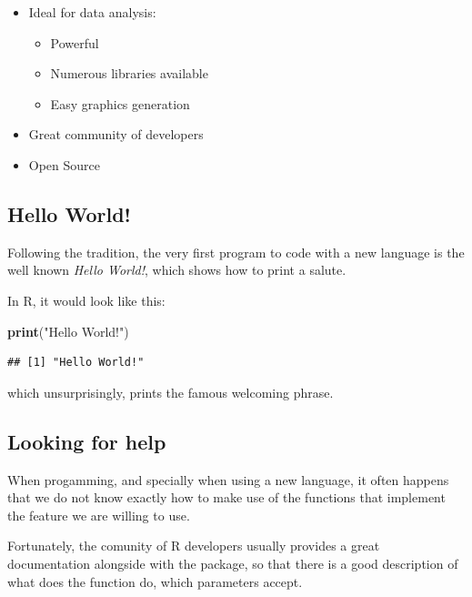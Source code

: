 \documentclass[]{article}
\newenvironment{Shaded}{\begin{snugshade}}{\end{snugshade}}
\newcommand{\KeywordTok}[1]{\textcolor[rgb]{0.13,0.29,0.53}{\textbf{#1}}}
\newcommand{\StringTok}[1]{\textcolor[rgb]{0.31,0.60,0.02}{#1}}
\newcommand{\NormalTok}[1]{#1}
\providecommand{\tightlist}{%
  \setlength{\itemsep}{0pt}\setlength{\parskip}{0pt}}
\begin{document}
\begin{itemize}
\tightlist
\item
  Ideal for data analysis:

  \begin{itemize}
  \tightlist
  \item
    Powerful
  \item
    Numerous libraries available
  \item
    Easy graphics generation
  \end{itemize}
\item
  Great community of developers
\item
  Open Source
\end{itemize}

\subsection{Hello World!}\label{hello-world}

Following the tradition, the very first program to code with a new
language is the well known \emph{Hello World!}, which shows how to print
a salute.

In R, it would look like this:

\begin{Shaded}
\begin{Highlighting}[]
\KeywordTok{print}\NormalTok{(}\StringTok{"Hello World!"}\NormalTok{)}
\end{Highlighting}
\end{Shaded}

\begin{verbatim}
## [1] "Hello World!"
\end{verbatim}

which unsurprisingly, prints the famous welcoming phrase.

\subsection{Looking for help}\label{looking-for-help}

When progamming, and specially when using a new language, it often
happens that we do not know exactly how to make use of the functions
that implement the feature we are willing to use.

Fortunately, the comunity of R developers usually provides a great
documentation alongside with the package, so that there is a good
description of what does the function do, which parameters accept.
\end{document}
